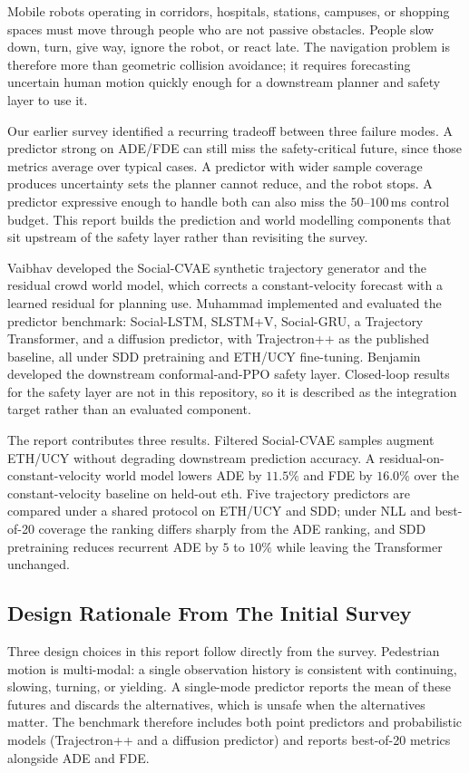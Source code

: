 \documentclass[conference]{IEEEtran}
\begin{document}
Mobile robots operating in corridors, hospitals, stations, campuses, or
shopping spaces must move through people who are not passive obstacles. People
slow down, turn, give way, ignore the robot, or react late. The navigation
problem is therefore more than geometric collision avoidance; it requires
forecasting uncertain human motion quickly enough for a downstream planner and
safety layer to use it.

Our earlier survey identified a recurring tradeoff between three
failure modes. A predictor strong on ADE/FDE can still miss the
safety-critical future, since those metrics average over typical
cases. A predictor with wider sample coverage produces uncertainty
sets the planner cannot reduce, and the robot stops. A predictor
expressive enough to handle both can also miss the $50$--$100$\,ms
control budget. This report builds the prediction and world modelling
components that sit upstream of the safety layer rather than
revisiting the survey.

Vaibhav developed the Social-CVAE synthetic trajectory generator and
the residual crowd world model, which corrects a constant-velocity
forecast with a learned residual for planning use. Muhammad
implemented and evaluated the predictor benchmark: Social-LSTM,
SLSTM+V, Social-GRU, a Trajectory Transformer, and a diffusion
predictor, with Trajectron++ as the published baseline, all under SDD
pretraining and ETH/UCY fine-tuning. Benjamin developed the
downstream conformal-and-PPO safety layer. Closed-loop results for
the safety layer are not in this repository, so it is described as
the integration target rather than an evaluated component.

The report contributes three results. Filtered Social-CVAE samples
augment ETH/UCY without degrading downstream prediction accuracy. A
residual-on-constant-velocity world model lowers ADE by $11.5\%$ and
FDE by $16.0\%$ over the constant-velocity baseline on held-out eth.
Five trajectory predictors are compared under a shared protocol on
ETH/UCY and SDD; under NLL and best-of-20 coverage the ranking
differs sharply from the ADE ranking, and SDD pretraining reduces
recurrent ADE by $5$ to $10\%$ while leaving the Transformer
unchanged.

\subsection{Design Rationale From The Initial Survey}

Three design choices in this report follow directly from the survey.
Pedestrian motion is multi-modal: a single observation history is
consistent with continuing, slowing, turning, or yielding. A
single-mode predictor reports the mean of these futures and discards
the alternatives, which is unsafe when the alternatives matter. The
benchmark therefore includes both point predictors and probabilistic
models (Trajectron++ and a diffusion predictor) and reports
best-of-20 metrics alongside ADE and FDE.
\end{document}
